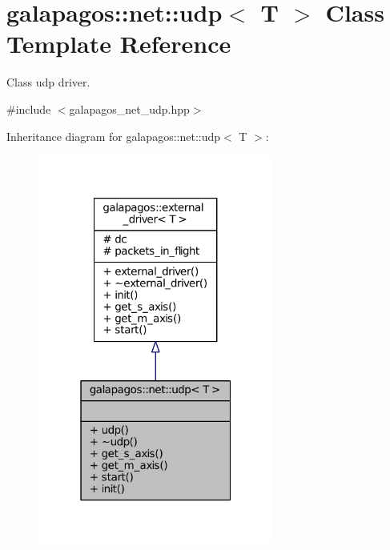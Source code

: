 \hypertarget{classgalapagos_1_1net_1_1udp}{}\section{galapagos\+:\+:net\+:\+:udp$<$ T $>$ Class Template Reference}
\label{classgalapagos_1_1net_1_1udp}


Class udp driver.  




{\ttfamily \#include $<$galapagos\+\_\+net\+\_\+udp.\+hpp$>$}



Inheritance diagram for galapagos\+:\+:net\+:\+:udp$<$ T $>$\+:
\nopagebreak
\begin{figure}[H]
\begin{center}
\leavevmode
\includegraphics[width=220pt]{classgalapagos_1_1net_1_1udp__inherit__graph}
\end{center}
\end{figure}


